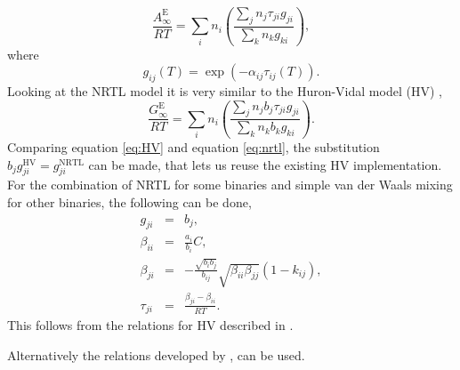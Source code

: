 \documentclass[english]{../thermomemo/thermomemo}
\newcommand{\excess}{\text{E}}
\begin{document}
\begin{equation}
  \frac{A_\infty^\excess}{RT} =
  \underset{i}{\sum}n_i\left(\frac{\underset{j}{\sum}n_j\tau_{ji}g_{ji}}{\underset{k}{\sum}n_k
      g_{ki}}\right),
  \label{eq:nrtl}
\end{equation}
where
\begin{equation}
  g_{ij}\left(T\right) =\exp{\left(-\alpha_{ij}\tau_{ij}\left(T\right)\right)}.
  \label{eq:gij}
\end{equation}
Looking at the NRTL model it is very similar to the Huron-Vidal model
(HV) \cite{Huron1979},
\begin{equation}
  \frac{G_\infty^\excess}{RT} =
  \underset{i}{\sum}n_i\left(\frac{\underset{j}{\sum}n_jb_{j}\tau_{ji}g_{ji}}{\underset{k}{\sum}n_kb_{k}
      g_{ki}}\right).
  \label{eq:HV}
\end{equation}
Comparing equation \ref{eq:HV} and equation \ref{eq:nrtl}, the
substitution $b_{j}g_{ji}^{\text{HV}} = g_{ji}^{\text{NRTL}}$ can be
made, that lets us reuse the existing HV implementation. For the
combination of NRTL for some binaries and simple van der Waals mixing
for other binaries, the following can be done,
\begin{eqnarray}
g_{ji} & = & b_{j},\\
\beta_{ii} & = & \frac{a_{i}}{b_{i}}C,\\
\beta_{ji} & = & -\frac{\sqrt{b_i b_j}}{b_{ij}}\sqrt{\beta_{ii}\beta_{jj}}\left(1-k_{ij}\right),\\
\tau_{ji} &=& \frac{\beta_{ji}-\beta_{ii}}{RT}.
\end{eqnarray}
This follows from the relations for HV described in
\cite{Wilhelmsen2013}.

Alternatively the relations developed by \cite{Twu2001}, can be used.
\end{document}
